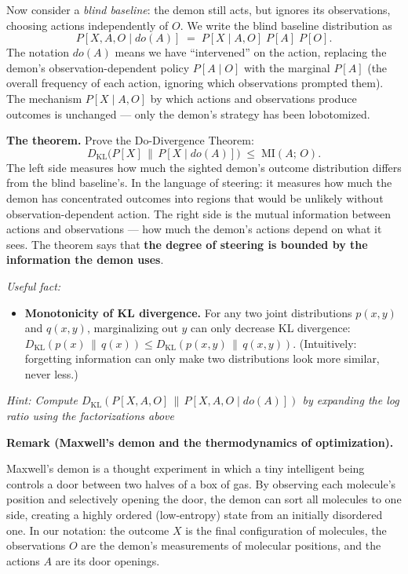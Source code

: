 \documentclass[8pt]{article}
\begin{document}
\medskip
\noindent
Now consider a \emph{blind baseline}: the demon still acts, but ignores its
observations, choosing actions independently of $O$. We write the blind baseline
distribution as
\[
  P[X, A, O \mid do(A)] \;=\; P[X \mid A, O]\; P[A]\; P[O].
\]
The notation $do(A)$ means we have ``intervened'' on the action, replacing the
demon's observation-dependent policy $P[A \mid O]$ with the marginal $P[A]$ (the
overall frequency of each action, ignoring which observations prompted them). The
mechanism $P[X \mid A, O]$ by which actions and observations produce outcomes is
unchanged --- only the demon's strategy has been lobotomized.

\medskip
\noindent
\textbf{The theorem.} Prove the Do-Divergence Theorem:
\[
  D_{\mathrm{KL}}\bigl(P[X] \,\big\|\, P[X \mid do(A)]\bigr)
  \;\leq\; \mathrm{MI}(A;\, O).
\]
The left side measures how much the sighted demon's outcome distribution differs from
the blind baseline's. In the language of steering: it measures how much the demon has
concentrated outcomes into regions that would be unlikely without observation-dependent
action. The right side is the mutual information between actions and observations ---
how much the demon's actions depend on what it sees. The theorem says that \textbf{the
degree of steering is bounded by the information the demon uses}.

\medskip
\noindent
\emph{Useful fact:}
\begin{itemize}
  \item \textbf{Monotonicity of KL divergence.} For any two joint distributions
    $p(x,y)$ and $q(x,y)$, marginalizing out $y$ can only decrease KL divergence:
    $D_{\mathrm{KL}}(p(x) \,\|\, q(x)) \leq D_{\mathrm{KL}}(p(x,y) \,\|\, q(x,y))$.
    (Intuitively: forgetting information can only make two distributions look more
    similar, never less.)
\end{itemize}

\medskip
\noindent
\emph{Hint: Compute $D_{\mathrm{KL}}(P[X, A, O] \,\|\, P[X, A, O \mid do(A)])$
by expanding the log ratio using the factorizations above}

\medskip
\noindent
\textbf{Remark (Maxwell's demon and the thermodynamics of optimization).}

\medskip
\noindent
Maxwell's demon is a thought experiment in which a tiny intelligent being controls a
door between two halves of a box of gas. By observing each molecule's position and
selectively opening the door, the demon can sort all molecules to one side, creating a
highly ordered (low-entropy) state from an initially disordered one. In our notation:
the outcome $X$ is the final configuration of molecules, the observations $O$ are the
demon's measurements of molecular positions, and the actions $A$ are its door
openings.
\end{document}
